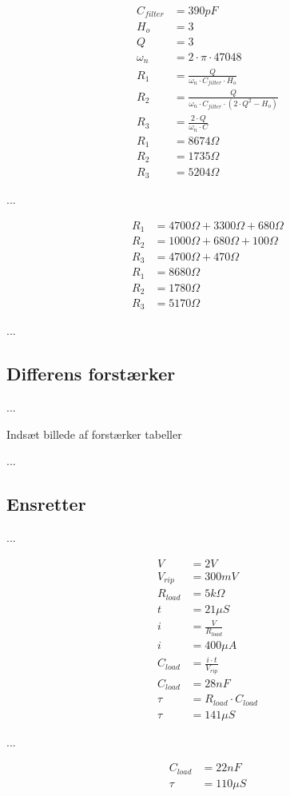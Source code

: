 \begin{equation}
\label{eq:FilterModstande}
\begin{split}
C_{filter} & = 390pF\\
H_o & = 3\\
Q & = 3\\
\omega_n & = 2 \cdot \pi \cdot 47048 \\
R_1 & = \frac{Q}{\omega_n \cdot C_{filter} \cdot H_o } \\
R_2 & = \frac{Q}{ \omega_n \cdot C_{filter} \cdot \left( 2 \cdot Q^2 - H_o \right) } \\
R_3 & = \frac{2 \cdot Q}{ \omega_n \cdot C} \\
R_1 & = 8674 \Omega \\
R_2 & = 1735 \Omega \\
R_3 & = 5204 \Omega
\end{split}
\end{equation}

...

\begin{equation}
\label{eq:FilterModstandeTilnaermelse}
\begin{split}
R_1 & = 4700 \Omega + 3300 \Omega + 680 \Omega \\
R_2 & = 1000 \Omega + 680 \Omega + 100 \Omega \\
R_3 & = 4700 \Omega + 470 \Omega \\
R_1 & = 8680 \Omega \\
R_2 & = 1780 \Omega \\
R_3 & = 5170 \Omega
\end{split}
\end{equation}

...

\subsection{Differens forstærker}
...

Indsæt billede af forstærker tabeller

... 

\subsection{Ensretter}
...

\begin{equation}
\label{eq:EnsretterKondensator}
\begin{split}
V & = 2V \\
V_{rip} & = 300mV \\
R_{load} & = 5k \Omega \\
t & = 21 \mu S \\
i & = \frac{V}{R_{load}} \\
i & = 400 \mu A \\
C_{load} & = \frac{i \cdot t}{V_{rip} }\\
C_{load} & = 28nF \\
\tau & = R_{load} \cdot C_{load} \\
\tau & = 141 \mu S
\end{split}
\end{equation}

...

\begin{equation}
\label{eq:EnsretterKondensatorTilnaermelse}
\begin{split}
C_{load} & = 22nF \\
\tau & = 110 \mu S
\end{split}
\end{equation}